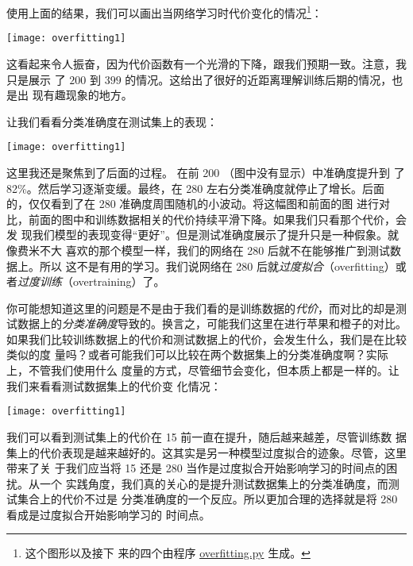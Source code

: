 使用上面的结果，我们可以画出当网络学习时代价变化的情况\footnote{这个图形以及接下
  来的四个由程序
  \href{https://github.com/mnielsen/neural-networks-and-deep-learning/blob/master/fig/overfitting.py}{overfitting.py}
  生成。}：
\begin{center}
  \texttt{[image: overfitting1]}
\end{center}
  
这看起来令人振奋，因为代价函数有一个光滑的下降，跟我们预期一致。注意，我只是展示
了 $200$ 到 $399$ \epoch{}的情况。这给出了很好的近距离理解训练后期的情况，也是出
现有趣现象的地方。

让我们看看分类准确度在测试集上的表现：
\begin{center}
  \texttt{[image: overfitting1]}  %
\end{center}

这里我还是聚焦到了后面的过程。 在前 200 \epochs{}（图中没有显示）中准确度提升到
了 82\%。然后学习逐渐变缓。最终，在 280 \epoch{}左右分类准确度就停止了增长。后面
的\epochs{}，仅仅看到了在 280 \epoch{}准确度周围随机的小波动。将这幅图和前面的图
进行对比，前面的图中和训练数据相关的代价持续平滑下降。如果我们只看那个代价，会发
现我们模型的表现变得``更好''。但是测试准确度展示了提升只是一种假象。就像费米不大
喜欢的那个模型一样，我们的网络在 280 \epoch{}后就不在能够推广到测试数据上。所以
这不是有用的学习。我们说网络在 280 \epoch{}后就\emph{过度拟合}（overfitting）或者\emph{过度训练}（overtraining）了。

你可能想知道这里的问题是不是由于我们看的是训练数据的\emph{代价}，而对比的却是测
试数据上的\emph{分类准确度}导致的。换言之，可能我们这里在进行苹果和橙子的对比。
如果我们比较训练数据上的代价和测试数据上的代价，会发生什么，我们是在比较类似的度
量吗？或者可能我们可以比较在两个数据集上的分类准确度啊？实际上，不管我们使用什么
度量的方式，尽管细节会变化，但本质上都是一样的。让我们来看看测试数据集上的代价变
化情况：
\begin{center}
  \texttt{[image: overfitting1]}  %
\end{center}

我们可以看到测试集上的代价在 15 \epoch{}前一直在提升，随后越来越差，尽管训练数
据集上的代价表现是越来越好的。这其实是另一种模型过度拟合的迹象。尽管，这里带来了关
于我们应当将 15 还是 280 \epoch{}当作是过度拟合开始影响学习的时间点的困扰。从一个
实践角度，我们真的关心的是提升测试数据集上的分类准确度，而测试集合上的代价不过是
分类准确度的一个反应。所以更加合理的选择就是将 280 \epoch{}看成是过度拟合开始影响学习的
时间点。

